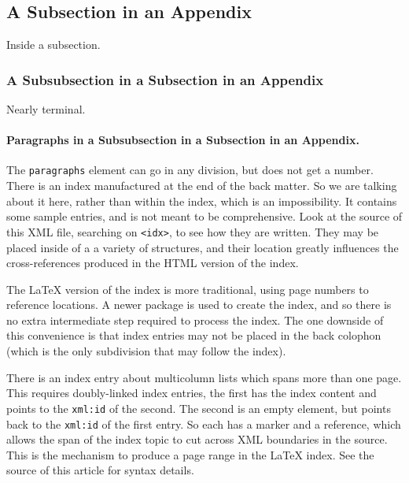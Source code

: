 \documentclass{sn-jnl}
\theoremstyle{thmstyleone}%
\theoremstyle{thmstyletwo}%
\theoremstyle{thmstylethree}%
\newcommand{\mono}[1]{\texttt{#1}}
\numberwithin{equation}{section}
\begin{document}
\begin{appendices}
\subsection{A Subsection in an Appendix}\label{appendix-structured-3}%
Inside a subsection.%
%
%
\typeout{************************************************}
\typeout{************************************************}
%
\subsubsection{A Subsubsection in a Subsection in an Appendix}\label{appendix-structured-3-3}%
Nearly terminal.%
\paragraph*{Paragraphs in a Subsubsection in a Subsection in an Appendix.}\label{appendix-structured-3-3-3}%
The \mono{paragraphs} element can go in any division, but does not get a number.%
%
%
\typeout{************************************************}
\typeout{************************************************}
%
\label{appendix-index}%
There is an index manufactured at the end of the back matter.  So we are talking about it here, rather than within the index, which is an impossibility.  It contains some sample entries, and is not meant to be comprehensive.  Look at the source of this XML file, searching on \mono{<idx>}, to see how they are written.  They may be placed inside of a a variety of structures, and their location greatly influences the cross-references produced in the HTML version of the index.%
\par
The \LaTeX{} version of the index is more traditional, using page numbers to reference locations.  A newer package is used to create the index, and so there is no extra intermediate step required to process the index.  The one downside of this convenience is that index entries may not be placed in the back colophon (which is the only subdivision that may follow the index).%
\par
There is an index entry about multicolumn lists which spans more than one page.  This requires doubly-linked index entries, the first has the index content and points to the \mono{xml:id} of the second.  The second is an empty element, but points back to the \mono{xml:id} of the first entry.  So each has a marker and a reference, which allows the span of the index topic to cut across XML boundaries in the source.  This is the mechanism to produce a page range in the \LaTeX{} index.  See the source of this article for syntax details.%

\end{appendices}
\end{document}
